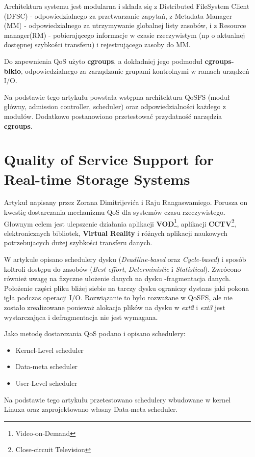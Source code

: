 Architektura systemu jest modularna i składa się z Distributed FileSystem Client (DFSC) - odpowiedzialnego za przetwarzanie zapytań, 
z Metadata Manager (MM) - odpowiedzialnego za utrzymywanie globalnej listy zasobów,
i z Resource manager(RM) - pobierającego informacje w czasie rzeczywistym (np o aktualnej dostępnej szybkości transferu) i rejestrującego zasoby do MM.

Do zapewnienia QoS użyto \textbf{cgroups}, a dokładniej jego podmoduł \textbf{cgroups-blkio},
odpowiedzialnego za zarządzanie grupami kontrolnymi w ramach urządzeń I/O.

Na podstawie tego artykułu powstała wstępna architektura QoSFS (moduł główny, admission controller, scheduler) oraz odpowiedzialności każdego z modułów. Dodatkowo
postanowiono przetestować przydatność narzędzia \textbf{cgroups}.

\section{Quality of Service Support for Real-time Storage Systems}

Artykuł napisany przez Zorana Dimitrijevića i Raju Rangaswamiego.
Porusza on kwestię dostarczania mechanizmu QoS dla systemów czasu rzeczywistego.
Głownym celem jest ulepszenie działania aplikacji \textbf{VOD}\footnote{Video-on-Demand},
aplikacji \textbf{CCTV}\footnote{Close-circuit Television}, elektronicznych bibliotek,
\textbf{Virtual Reality} i różnych aplikacji naukowych potrzebujacych
dużej szybkości transferu danych.

W artykule opisano schedulery dysku (\textit{Deadline-based} oraz \textit{Cycle-based}) i sposób koltroli dostępu do zasobów (\textit{Best effort}, \textit{Deterministic} i \textit{Statistical}).
Zwrócono również uwagę na fizyczne ułożenie danych na dysku  -fragmentacja danych.
Położenie części pliku bliżej siebie na tarczy dysku
ograniczy dystans jaki pokona igła podczas operacji I/O.
Rozwiązanie to było rozważane w QoSFS, ale nie zostało zrealizowane
ponieważ alokacja plików na dysku w \textit{ext2} i \textit{ext3}
jest wystarczająca i defragmentacja nie jest wymagana.

Jako metodę dostarczania QoS podano i opisano schedulery: 
\begin{itemize}
	\item Kernel-Level scheduler
    \item Data-meta scheduler
    \item User-Level scheduler
\end{itemize}

Na podstawie tego artykułu przetestowano schedulery wbudowane w 
kernel Linuxa oraz zaprojektowano własny Data-meta scheduler.
